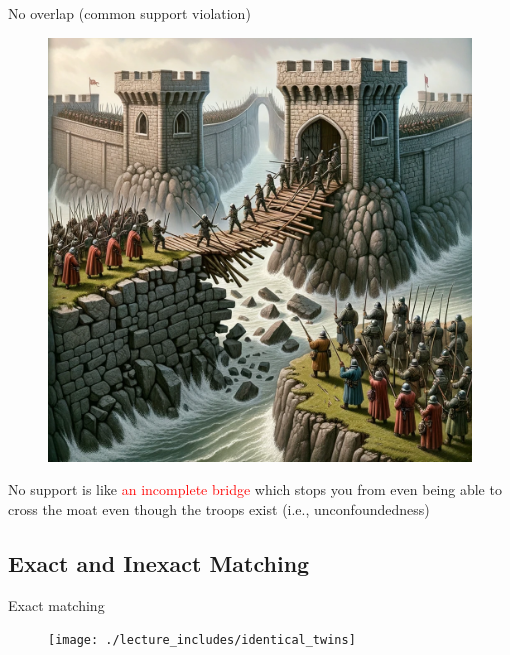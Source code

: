 \documentclass{beamer}
\begin{document}
\begin{frame}{No overlap (common support violation)}

  \begin{figure}
    \includegraphics[scale=0.17]{./lecture_includes/matching_nosupport.png}
  \end{figure}

No support is like \textcolor{red}{an incomplete bridge} which stops you from even being able to cross the moat even though the troops exist (i.e., unconfoundedness)


\end{frame}



\subsection{Exact and Inexact Matching}

\begin{frame}{Exact matching}

\begin{figure}[!t]\centering
\texttt{[image: ./lecture\_includes/identical\_twins]}
\end{figure}

\end{frame}
\end{document}
